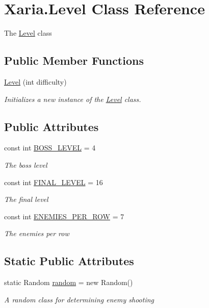 \hypertarget{classXaria_1_1Level}{}\section{Xaria.\+Level Class Reference}
\label{classXaria_1_1Level}


The \hyperlink{classXaria_1_1Level}{Level} class  


\subsection*{Public Member Functions}
\begin{DoxyCompactItemize}
\item 
\hyperlink{classXaria_1_1Level_abbe8f5dc4eb2b1ea9bb259a4e1440838}{Level} (int difficulty)
\begin{DoxyCompactList}\small\item\em Initializes a new instance of the \hyperlink{classXaria_1_1Level}{Level} class. \end{DoxyCompactList}\end{DoxyCompactItemize}
\subsection*{Public Attributes}
\begin{DoxyCompactItemize}
\item 
const int \hyperlink{classXaria_1_1Level_a7ff38927b2a440eca51807fcc4f53109}{B\+O\+S\+S\+\_\+\+L\+E\+V\+EL} = 4
\begin{DoxyCompactList}\small\item\em The boss level \end{DoxyCompactList}\item 
const int \hyperlink{classXaria_1_1Level_aeefce3beb83d2578ed9f63c59c0a7e9d}{F\+I\+N\+A\+L\+\_\+\+L\+E\+V\+EL} = 16
\begin{DoxyCompactList}\small\item\em The final level \end{DoxyCompactList}\item 
const int \hyperlink{classXaria_1_1Level_afd8806018ddf8b47dbec8a495ed8e3b4}{E\+N\+E\+M\+I\+E\+S\+\_\+\+P\+E\+R\+\_\+\+R\+OW} = 7
\begin{DoxyCompactList}\small\item\em The enemies per row \end{DoxyCompactList}\end{DoxyCompactItemize}
\subsection*{Static Public Attributes}
\begin{DoxyCompactItemize}
\item 
static Random \hyperlink{classXaria_1_1Level_a9782c177ac48834cf40de7ab5a17469f}{random} = new Random()
\begin{DoxyCompactList}\small\item\em A random class for determining enemy shooting \end{DoxyCompactList}\end{DoxyCompactItemize}
